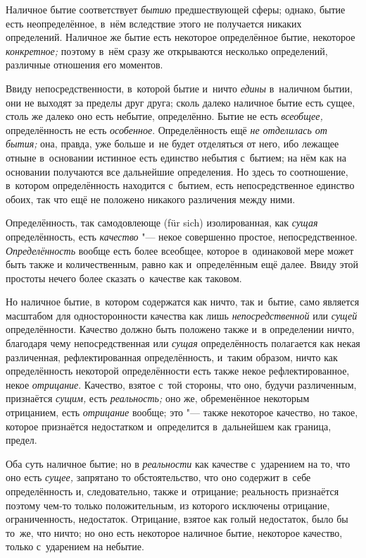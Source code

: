 Наличное бытие соответствует {\em бытию} предшествующей сферы; однако, бытие
есть неопределённое, в~нём вследствие этого не получается никаких определений.
Наличное же бытие есть некоторое определённое бытие, некоторое
{\em конкретное;} поэтому в~нём сразу же открываются несколько определений,
различные отношения его моментов.


Ввиду непосредственности, в~которой бытие и~ничто
{\em едины} в~наличном бытии, они не выходят за пределы
друг друга; сколь далеко наличное бытие есть сущее, столь же далеко оно
есть небытие, определённо. Бытие не есть {\em всеобщее,}
определённость не есть {\em особенное}. Определённость
ещё {\em не отделилась от бытия;} она, правда, уже
больше и~не будет отделяться от него, ибо лежащее отныне в~основании
истинное есть единство небытия с~бытием; на нём как на основании получаются
все дальнейшие определения. Но здесь то соотношение, в~котором
определённость находится с~бытием, есть непосредственное единство обоих,
так что ещё не положено никакого различения между ними.

Определённость, так самодовлеюще (für sich) изолированная, как
{\em сущая} определённость, есть
{\em качество} "--- некое совершенно простое,
непосредственное. {\em Определённость} вообще есть
более всеобщее, которое в~одинаковой мере может быть также и
количественным, равно как и~определённым ещё далее. Ввиду этой простоты
нечего более сказать о~качестве как таковом.

Но наличное бытие, в~котором содержатся как ничто, так и~бытие, само
является масштабом для односторонности качества как лишь
{\em непосредственной} или {\em сущей} определённости. Качество должно быть
положено также и~в определении ничто, благодаря чему непосредственная или
{\em сущая} определённость полагается как некая
различенная, рефлектированная определённость, и~таким образом, ничто как
определённость некоторой определённости есть также некое рефлектированное,
некое {\em отрицание}. Качество, взятое с~той стороны,
что оно, будучи различенным, признаётся {\em сущим,}
есть {\em реальность;} оно же, обременённое некоторым
отрицанием, есть {\em отрицание} вообще; это "--- также
некоторое качество, но такое, которое признаётся недостатком и~определится
в~дальнейшем как граница, предел.

Оба суть наличное бытие; но в {\em реальности} как качестве с~ударением на то,
что оно есть {\em сущее,} запрятано то обстоятельство, что оно содержит в~себе
определённость и, следовательно, также и~отрицание; реальность признаётся
поэтому чем-то только положительным, из которого исключены отрицание,
ограниченность, недостаток. Отрицание, взятое как голый недостаток, было бы
то~же, что ничто; но оно есть некоторое наличное бытие, некоторое качество,
только с~ударением на небытие.

